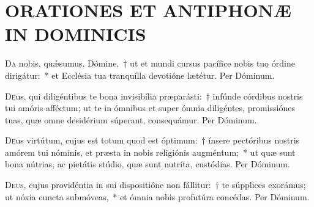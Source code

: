 \documentclass[vesperale_romanum.tex]{subfiles}
\begin{document}
\thispagestyle{empty}

\section[Dominicæ post Pentecosten.]{ORATIONES ET ANTIPHONÆ IN DOMINICIS}

{} %




\oratio

\lettrine{D}{a} nobis, quǽsumus, Dómine,~† ut et mundi cursus pacífice nobis tuo órdine dirigátur:~* et Ecclésia tua tranquílla devotióne lætétur. Per Dóminum.



\oratio

\lettrine{D}{e}us, qui diligéntibus te bona invisibília præparásti:~† infúnde córdibus nostris tui amóris afféctum; ut te in ómnibus et super ómnia diligéntes, promissiónes tuas, quæ omne desidérium súperant, consequámur. Per Dóminum.



\oratio

\lettrine{D}{e}us virtútum, cujus est totum quod est óptimum:~† ínsere pectóribus nostris amórem tui nóminis, et præsta in nobis religiónis augméntum;~* ut quæ sunt bona nútrias, ac pietátis stúdio, quæ sunt nutríta, custódias.
Per Dóminum.



\oratio

\lettrine{D}{eus}, cujus providéntia in sui dispositióne non fállitur:~† te súpplices exorámus; ut nóxia cuncta submóveas,~* et ómnia nobis profutúra concédas.
Per Dóminum. 
\end{document}
